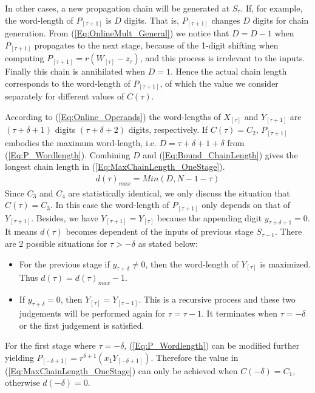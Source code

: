 \documentclass{acm_proc_article-sp}
\begin{document}
%
In other cases, a new propagation chain will be generated at $S_{\tau}$. If, for example, the word-length of $P_{[\tau+1]}$ is $D$ digits. That is, $P_{[\tau+1]}$ changes $D$ digits for chain generation. From (\ref{Eq:OnlineMult_General}) we notice that $D=D-1$ when $P_{[\tau+1]}$ propagates to the next stage, because of the 1-digit shifting when computing $P_{[\tau+1]}=r(W_{[\tau]}-z_{\tau})$, and this process is irrelevant to the inputs. Finally this chain is annihilated when $D=1$. Hence the actual chain length corresponds to the word-length of $P_{[\tau+1]}$, of which the value we consider separately for different values of $C(\tau)$.\vspace{-1ex}

According to (\ref{Eq:Online_Operands}) the word-lengths of $X_{[\tau]}$ and $Y_{[\tau+1]}$ are $(\tau+\delta+1)$ digits $(\tau+\delta+2)$ digits, respectively. If $C(\tau)=C_2$, $P_{[\tau+1]}$ embodies the maximum word-length, i.e. $D=\tau+\delta+1+\delta$ from (\ref{Eq:P_Wordlength}). Combining $D$ and (\ref{Eq:Bound_ChainLength}) gives the longest chain length in (\ref{Eq:MaxChainLength_OneStage}).
%
\begin{eqnarray}\label{Eq:MaxChainLength_OneStage}
  d(\tau)_{max}=Min(D,N-1-\tau)
\end{eqnarray}
%
Since $C_3$ and $C_4$ are statistically identical, we only discuss the situation that $C(\tau)=C_3$. In this case the word-length of $P_{[\tau+1]}$ only depends on that of $Y_{[\tau+1]}$. Besides, we have $Y_{[\tau+1]}=Y_{[\tau]}$ because the appending digit $y_{\tau+\delta+1}=0$. It means $d(\tau)$ becomes dependent of the inputs of previous stage $S_{\tau-1}$. There are 2 possible situations for $\tau>-\delta$ as stated below:
\vspace{-1.5ex}
\begin{itemize}
  \item For the previous stage if $y_{\tau+\delta}\neq0$, then the word-length of $Y_{[\tau]}$ is maximized. Thus $d(\tau)=d(\tau)_{max}-1$.
  \item If $y_{\tau+\delta}=0$, then $Y_{[\tau]}=Y_{[\tau-1]}$. This is a recursive process and these two judgements will be performed again for $\tau=\tau-1$. It terminates when $\tau=-\delta$ or the first judgement is satisfied.
\end{itemize}
\vspace{-1ex}
For the first stage where $\tau=-\delta$, (\ref{Eq:P_Wordlength}) can be modified further yielding $P_{[-\delta+1]}=r^{\delta+1}(x_1Y_{[-\delta+1]})$. Therefore the value in (\ref{Eq:MaxChainLength_OneStage}) can only be achieved when $C(-\delta)=C_1$, otherwise $d(-\delta)=0$.\vspace{-1ex}
\end{document}
